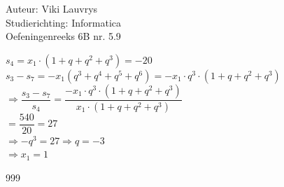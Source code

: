 \documentclass[a4paper]{article}
\begin{document}
  
\noindent \large Auteur: Viki	Lauvrys \\
\noindent \large Studierichting: Informatica\\
\noindent \large Oefeningenreeks 6B nr. 5.9 \\

\medskip

\normalsize

$ s_4 = x_1 \cdot (1 +q +q^2 +q^3) = -20 $ \\

$ s_3 - s_7 = -x_1 (q^3 + q^4 + q^5 + q^6) = -x_1 \cdot q^3 \cdot (1 + q+ q^2 + q^3) $ \\

$ \Rightarrow \dfrac{s_3 - s_7}{s_4} = \dfrac{-x_1 \cdot q^3 \cdot (1 + q+ q^2 + q^3) }{x_1 \cdot (1 + q+ q^2 + q^3)} $ \\

$ = \dfrac{540}{20} = 27 $ \\

$ \Rightarrow -q^3 = 27 \Rightarrow q = -3 $ \\

$ \Rightarrow x_1 = 1 $ \\


\begin{thebibliography}{999}
\end{thebibliography}
\end{document}
